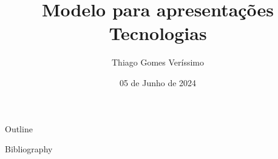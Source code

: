 \documentclass{beamer}
\title[Modelo para apresentações]{Modelo para apresentações\\Tecnologias}
\author{Thiago Gomes Veríssimo}
\institute{Universidade de São Paulo}
\date{05 de Junho de 2024}
\begin{document}
\begin{frame}
\titlepage
\end{frame}

\begin{frame}{Outline}
    \tableofcontents
\end{frame}




\begin{frame}{Bibliography}
    
    
\end{frame}
\end{document}
